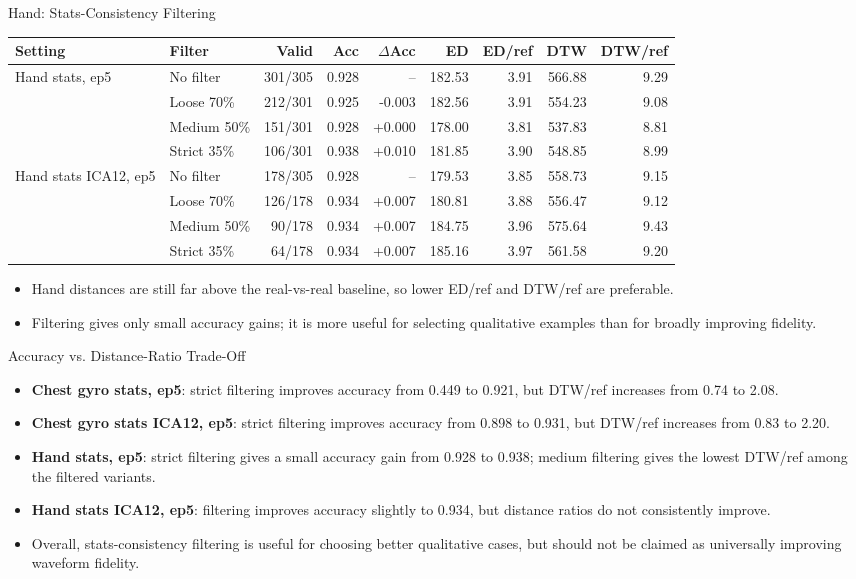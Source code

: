 \begin{frame}{Hand: Stats-Consistency Filtering}
\scriptsize
\begin{adjustbox}{max width=\textwidth}
\begin{tabular}{llrrrrrrr}
\toprule
Setting & Filter & Valid & Acc & $\Delta$Acc & ED & ED/ref & DTW & DTW/ref \\
\midrule
Hand stats, ep5 & No filter & 301/305 & 0.928 & -- & 182.53 & 3.91 & 566.88 & 9.29 \\
 & Loose 70\% & 212/301 & 0.925 & -0.003 & 182.56 & 3.91 & 554.23 & 9.08 \\
 & Medium 50\% & 151/301 & 0.928 & +0.000 & 178.00 & 3.81 & 537.83 & 8.81 \\
 & Strict 35\% & 106/301 & 0.938 & +0.010 & 181.85 & 3.90 & 548.85 & 8.99 \\
\addlinespace
Hand stats ICA12, ep5 & No filter & 178/305 & 0.928 & -- & 179.53 & 3.85 & 558.73 & 9.15 \\
 & Loose 70\% & 126/178 & 0.934 & +0.007 & 180.81 & 3.88 & 556.47 & 9.12 \\
 & Medium 50\% & 90/178 & 0.934 & +0.007 & 184.75 & 3.96 & 575.64 & 9.43 \\
 & Strict 35\% & 64/178 & 0.934 & +0.007 & 185.16 & 3.97 & 561.58 & 9.20 \\
\bottomrule
\end{tabular}
\end{adjustbox}
\vspace{0.4em}
\begin{itemize}
  \item Hand distances are still far above the real-vs-real baseline, so lower ED/ref and DTW/ref are preferable.
  \item Filtering gives only small accuracy gains; it is more useful for selecting qualitative examples than for broadly improving fidelity.
\end{itemize}
\end{frame}

\begin{frame}{Accuracy vs. Distance-Ratio Trade-Off}
\small
\begin{itemize}
  \item \textbf{Chest gyro stats, ep5}: strict filtering improves accuracy from 0.449 to 0.921, but DTW/ref increases from 0.74 to 2.08.
  \item \textbf{Chest gyro stats ICA12, ep5}: strict filtering improves accuracy from 0.898 to 0.931, but DTW/ref increases from 0.83 to 2.20.
  \item \textbf{Hand stats, ep5}: strict filtering gives a small accuracy gain from 0.928 to 0.938; medium filtering gives the lowest DTW/ref among the filtered variants.
  \item \textbf{Hand stats ICA12, ep5}: filtering improves accuracy slightly to 0.934, but distance ratios do not consistently improve.
  \item Overall, stats-consistency filtering is useful for choosing better qualitative cases, but should not be claimed as universally improving waveform fidelity.
\end{itemize}
\end{frame}
